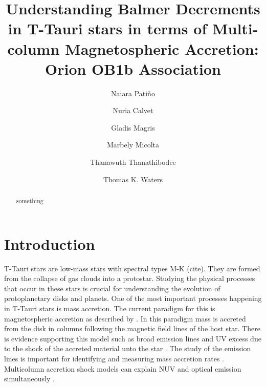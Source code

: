 \documentclass[twocolumn,linenumbers]{aastex631}
\begin{document}
\title{Understanding Balmer Decrements in T-Tauri stars in terms of Multi-column Magnetospheric Accretion: Orion OB1b Association}


\author[0009-0009-7455-6777]{Naiara Patiño}

\author[0000-0002-3950-5386]{Nuria Calvet}

\author[0000-0003-1166-5123]{Gladis Magris}

\author[0000-0001-8022-4378]{Marbely Micolta}

\author[0000-0003-4507-1710]{Thanawuth Thanathibodee}

\author[0000-0002-5231-7240]{Thomas K. Waters}




\begin{abstract}

    something
    
\end{abstract}


\section{Introduction}

T-Tauri stars are low-mass stars with spectral types M-K (cite). They are formed from the collapse of gas clouds into a protostar. Studying the physical processes that occur in these stars is crucial for understanding the evolution of protoplanetary disks and planets. One of the most important processes happening in T-Tauri stars is mass accretion. The current paradigm for this is magnetospheric accretion as described by \citet{hartmann2016}. In this paradigm mass is accreted from the disk in columns following the magnetic field lines of the host star. There is evidence supporting this model such as broad emission lines \citep{muzerolle2001} and UV excess due to the shock of the accreted material unto the star \citep{calvet_gullbring1998}. The study of the emission lines is important for identifying and measuring mass accretion rates \citep{hartmann1994, muzerolle1998a, muzerolle1998b, muzerolle2001}. Multicolumn accretion shock models can explain NUV and optical emission simultaneously \citep{ingleby2013}.
\end{document}
